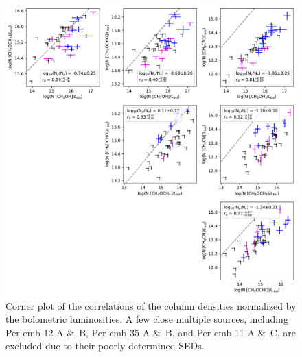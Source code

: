 \documentclass[twocolumn]{aastex62}
\begin{document}
\addtocounter{figure}{-1}
\begin{figure}[htbp!]
  \centering
  \includegraphics[width=\textwidth]{corner_Ncol_correlations_norm_Lbol.pdf}
  \caption{Corner plot of the correlations of the column densities normalized by the bolometric luminosities.  A few close multiple sources, including Per-emb 12 A \&\ B, Per-emb 35 A \&\ B, and Per-emb 11 A \&\ C, are excluded due to their poorly determined SEDs.}
  \label{fig:corner_lbol}
\end{figure}
\end{document}
